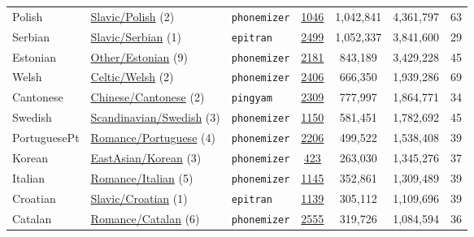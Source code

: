 \begin{table}[t]
\begin{tabular}{lllcccc}
        Polish & \href{https://childes.talkbank.org/access/slavic}{Slavic/Polish} (2) & \texttt{phonemizer} & \href{https://phoible.org/inventories/view/1046}{1046} & 1,042,841 & 4,361,797 & 63 \\
        Serbian & \href{https://childes.talkbank.org/access/slavic}{Slavic/Serbian} (1) & \texttt{epitran} & \href{https://phoible.org/inventories/view/2499}{2499} & 1,052,337 & 3,841,600 & 29 \\
        Estonian & \href{https://childes.talkbank.org/access/other}{Other/Estonian} (9) & \texttt{phonemizer} & \href{https://phoible.org/inventories/view/2181}{2181} & 843,189 & 3,429,228 & 45 \\
        Welsh & \href{https://childes.talkbank.org/access/celtic}{Celtic/Welsh} (2) & \texttt{phonemizer} & \href{https://phoible.org/inventories/view/2406}{2406} & 666,350 & 1,939,286 & 69 \\
        Cantonese & \href{https://childes.talkbank.org/access/chinese}{Chinese/Cantonese} (2) & \texttt{pingyam} & \href{https://phoible.org/inventories/view/2309}{2309} & 777,997 & 1,864,771 & 34 \\
        Swedish & \href{https://childes.talkbank.org/access/scandinavian}{Scandinavian/Swedish} (3) & \texttt{phonemizer} & \href{https://phoible.org/inventories/view/1150}{1150} & 581,451 & 1,782,692 & 45 \\
        PortuguesePt & \href{https://childes.talkbank.org/access/romance}{Romance/Portuguese} (4) & \texttt{phonemizer} & \href{https://phoible.org/inventories/view/2206}{2206} & 499,522 & 1,538,408 & 39 \\
        Korean & \href{https://childes.talkbank.org/access/eastasian}{EastAsian/Korean} (3) & \texttt{phonemizer} & \href{https://phoible.org/inventories/view/423}{423} & 263,030 & 1,345,276 & 37 \\
        Italian & \href{https://childes.talkbank.org/access/romance}{Romance/Italian} (5) & \texttt{phonemizer} & \href{https://phoible.org/inventories/view/1145}{1145} & 352,861 & 1,309,489 & 39 \\
        Croatian & \href{https://childes.talkbank.org/access/slavic}{Slavic/Croatian} (1) & \texttt{epitran} & \href{https://phoible.org/inventories/view/1139}{1139} & 305,112 & 1,109,696 & 39 \\
        Catalan & \href{https://childes.talkbank.org/access/romance}{Romance/Catalan} (6) & \texttt{phonemizer} & \href{https://phoible.org/inventories/view/2555}{2555} & 319,726 & 1,084,594 & 36 \\

\end{tabular}
\end{table}
